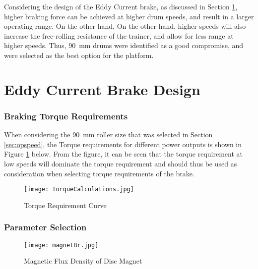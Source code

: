 Considering the design of the Eddy Current brake, as discussed in Section \ref{sec:Eddy}, higher braking force can be achieved at higher drum speeds, and result in a larger operating range. On the other hand,  On the other hand, higher speeds will also increase the free-rolling resistance of the trainer, and allow for less range at higher speeds. Thus, \SI{90}{\milli\meter} drums were identified as a good compromise, and were selected as the best option for the platform.\\

\newpage

\section{Eddy Current Brake Design}
\label{sec:Eddy}

\subsubsection{Braking Torque Requirements}

When considering the \SI{90}{\milli\meter} roller size that was selected in Section \ref{sec:opspeed}, the Torque requirements for different power outputs is shown in Figure \ref{fig:torqueCalc} below. From the figure, it can be seen that the torque requirement at low speeds will dominate the torque requirement and should thus be used as consideration when selecting torque requirements of the brake.

\begin{figure}[H]
	\begin{center}
		\texttt{[image: TorqueCalculations.jpg]}
		\caption{Torque Requirement Curve}
		\label{fig:torqueCalc}
	\end{center}
\end{figure}

\subsubsection{Parameter Selection}

\begin{figure}[H]
	\begin{center}
		\texttt{[image: magnetBr.jpg]}
		\caption{Magnetic Flux Density of Disc Magnet}
		\citep[Addapted from][]{Supermagnete:2010}
		\label{fig:B0}
	\end{center}
\end{figure}

